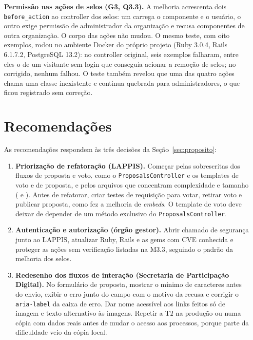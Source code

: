 \documentclass[journal]{IEEEtran}
\begin{document}
\textbf{Permissão nas ações de selos (G3, Q3.3).} A melhoria acrescenta dois \texttt{before\_action} ao controller dos selos: um carrega o componente e o usuário, o outro exige permissão de administrador da organização e recusa componentes de outra organização. O corpo das ações não mudou. O mesmo teste, com oito exemplos, rodou no ambiente Docker do próprio projeto (Ruby 3.0.4, Rails 6.1.7.2, PostgreSQL 13.2): no controller original, seis exemplos falharam, entre eles o de um visitante sem login que conseguia acionar a remoção de selos; no corrigido, nenhum falhou. O teste também revelou que uma das quatro ações chama uma classe inexistente e continua quebrada para administradores, o que ficou registrado sem correção.

\section{Recomendações}
\label{sec:recomendacoes}

As recomendações respondem às três decisões da Seção~\ref{sec:proposito}:

\begin{enumerate}
    \item \textbf{Priorização de refatoração (LAPPIS).} Começar pelas sobrescritas dos fluxos de proposta e voto, como o \texttt{ProposalsController} e os templates de voto e de proposta, e pelos arquivos que concentram complexidade e tamanho ( e ). Antes de refatorar, criar testes de requisição para votar, retirar voto e publicar proposta, como fez a melhoria de \textit{embeds}. O template de voto deve deixar de depender de um método exclusivo do \texttt{ProposalsController}.
    \item \textbf{Autenticação e autorização (órgão gestor).} Abrir chamado de segurança junto ao LAPPIS, atualizar Ruby, Rails e as gems com CVE conhecida e proteger as ações sem verificação listadas na M3.3, seguindo o padrão da melhoria dos selos.
    \item \textbf{Redesenho dos fluxos de interação (Secretaria de Participação Digital).} No formulário de proposta, mostrar o mínimo de caracteres antes do envio, exibir o erro junto do campo com o motivo da recusa e corrigir o \texttt{aria-label} da caixa de erro. Dar nome acessível aos links feitos só de imagem e texto alternativo às imagens. Repetir a T2 na produção ou numa cópia com dados reais antes de mudar o acesso aos processos, porque parte da dificuldade veio da cópia local.
\end{enumerate}
\end{document}
